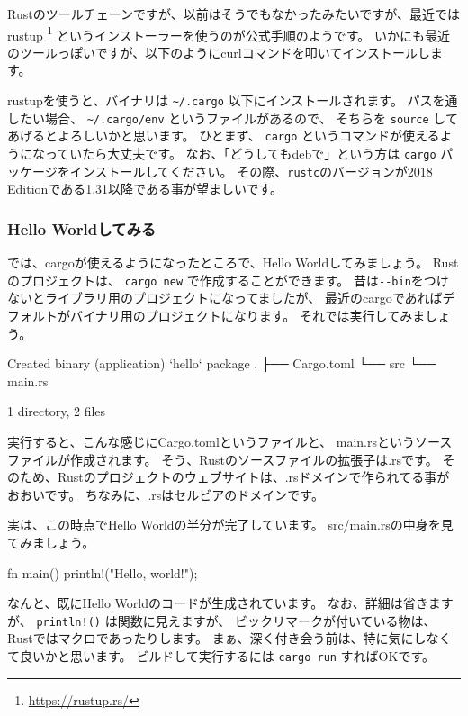 \documentclass[mingoth,a4paper]{jsarticle}
\begin{document}
Rustのツールチェーンですが、以前はそうでもなかったみたいですが、最近ではrustup%
\footnote{\url{https://rustup.rs/}}%
というインストーラーを使うのが公式手順のようです。
いかにも最近のツールっぽいですが、以下のようにcurlコマンドを叩いてインストールします。

\begin{commandline}
\end{commandline}

rustupを使うと、バイナリは \verb|~/.cargo| 以下にインストールされます。
パスを通したい場合、 \verb|~/.cargo/env| というファイルがあるので、
そちらを \texttt{source} してあげるとよろしいかと思います。
ひとまず、 \texttt{cargo} というコマンドが使えるようになっていたら大丈夫です。
なお、「どうしてもdebで」という方は \texttt{cargo} パッケージをインストールしてください。
その際、\texttt{rustc}のバージョンが2018 Editionである1.31以降である事が望ましいです。

\subsubsection{Hello Worldしてみる}

では、cargoが使えるようになったところで、Hello Worldしてみましょう。
Rustのプロジェクトは、 \verb|cargo new| で作成することができます。
昔は\verb|--bin|をつけないとライブラリ用のプロジェクトになってましたが、
最近のcargoであればデフォルトがバイナリ用のプロジェクトになります。
それでは実行してみましょう。

\begin{commandline}
     Created binary (application) `hello` package
.
├── Cargo.toml
└── src
    └── main.rs

1 directory, 2 files
\end{commandline}

実行すると、こんな感じにCargo.tomlというファイルと、
main.rsというソースファイルが作成されます。
そう、Rustのソースファイルの拡張子は.rsです。
そのため、Rustのプロジェクトのウェブサイトは、.rsドメインで作られてる事がおおいです。
ちなみに、.rsはセルビアのドメインです。

実は、この時点でHello Worldの半分が完了しています。
src/main.rsの中身を見てみましょう。

\begin{commandline}
fn main() {
    println!("Hello, world!");
}
\end{commandline}

なんと、既にHello Worldのコードが生成されています。
なお、詳細は省きますが、 \verb|println!()| は関数に見えますが、
ビックリマークが付いている物は、Rustではマクロであったりします。
まぁ、深く付き会う前は、特に気にしなくて良いかと思います。
ビルドして実行するには \verb|cargo run| すればOKです。
\end{document}

